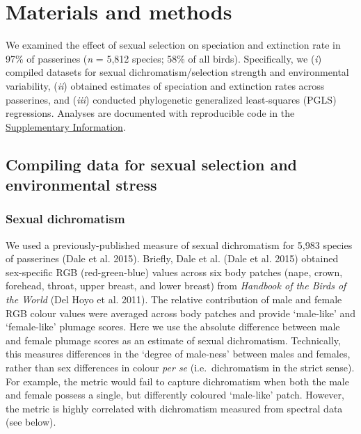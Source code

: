 \documentclass[]{article}
\begin{document}

\hypertarget{materials-and-methods}{%
\section{Materials and methods}\label{materials-and-methods}}

We examined the effect of sexual selection on speciation and extinction
rate in 97\% of passerines (\emph{n} = 5,812 species; 58\% of all
birds). Specifically, we (\emph{i}) compiled datasets for sexual
dichromatism/selection strength and environmental variability,
(\emph{ii}) obtained estimates of speciation and extinction rates across
passerines, and (\emph{iii}) conducted phylogenetic generalized
least-squares (PGLS) regressions. Analyses are documented with
reproducible code in the
\href{https://justincally.github.io/SexualSelection_Speciation/}{Supplementary Information}.

\hypertarget{compiling-data-for-sexual-selection-and-environmental-stress}{%
\subsection{Compiling data for sexual selection and environmental
stress}\label{compiling-data-for-sexual-selection-and-environmental-stress}}


\hypertarget{sexual-dichromatism}{%
\subsubsection{Sexual dichromatism}\label{sexual-dichromatism}}

We used a previously-published measure of sexual dichromatism for 5,983
species of passerines (Dale et al. 2015). Briefly, Dale et al. (Dale et
al. 2015) obtained sex-specific RGB (red-green-blue) values across six
body patches (nape, crown, forehead, throat, upper breast, and lower
breast) from \emph{Handbook of the Birds of the World} (Del Hoyo et al.
2011). The relative contribution of male and female RGB colour values
were averaged across body patches and provide `male-like' and
`female-like' plumage scores. Here we use the absolute difference
between male and female plumage scores as an estimate of sexual
dichromatism. Technically, this measures differences in the `degree of
male-ness' between males and females, rather than sex differences in
colour \emph{per se} (i.e.~dichromatism in the strict sense). For
example, the metric would fail to capture dichromatism when both the
male and female possess a single, but differently coloured `male-like'
patch. However, the metric is highly correlated with dichromatism
measured from spectral data (see below).
\end{document}
